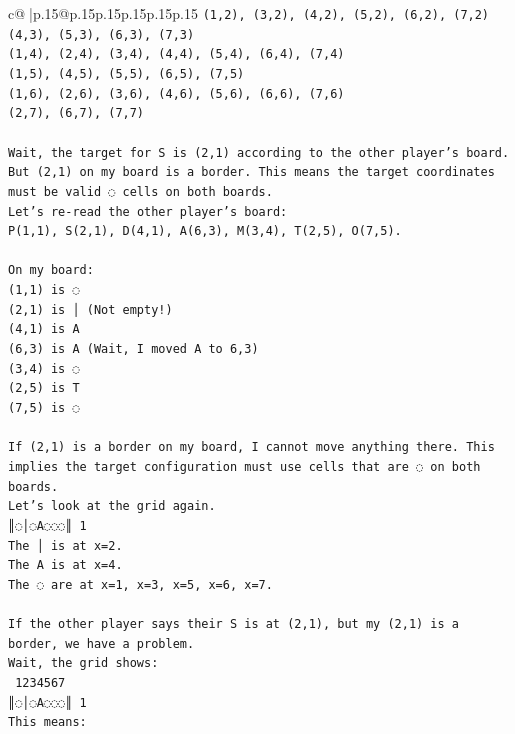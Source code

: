 \documentclass{article}
\begin{document}
{\begin{supertabular}{c@{$\;$}|p{.15\linewidth}@{}p{.15\linewidth}p{.15\linewidth}p{.15\linewidth}p{.15\linewidth}p{.15\linewidth}}
{{{\texttt{(1,2), (3,2), (4,2), (5,2), (6,2), (7,2)} \\
\texttt{(4,3), (5,3), (6,3), (7,3)} \\
\texttt{(1,4), (2,4), (3,4), (4,4), (5,4), (6,4), (7,4)} \\
\texttt{(1,5), (4,5), (5,5), (6,5), (7,5)} \\
\texttt{(1,6), (2,6), (3,6), (4,6), (5,6), (6,6), (7,6)} \\
\texttt{(2,7), (6,7), (7,7)} \\
\\ 
\texttt{Wait, the target for S is (2,1) according to the other player's board. But (2,1) on my board is a border. This means the target coordinates must be valid ◌ cells on both boards.} \\
\texttt{Let's re{-}read the other player's board:} \\
\texttt{P(1,1), S(2,1), D(4,1), A(6,3), M(3,4), T(2,5), O(7,5).} \\
\\ 
\texttt{On my board:} \\
\texttt{(1,1) is ◌} \\
\texttt{(2,1) is │ (Not empty!)} \\
\texttt{(4,1) is A} \\
\texttt{(6,3) is A (Wait, I moved A to 6,3)} \\
\texttt{(3,4) is ◌} \\
\texttt{(2,5) is T} \\
\texttt{(7,5) is ◌} \\
\\ 
\texttt{If (2,1) is a border on my board, I cannot move anything there. This implies the target configuration must use cells that are ◌ on both boards.} \\
\texttt{Let's look at the grid again.} \\
\texttt{║◌│◌A◌◌◌║ 1} \\
\texttt{The │ is at x=2.} \\
\texttt{The A is at x=4.} \\
\texttt{The ◌ are at x=1, x=3, x=5, x=6, x=7.} \\
\\ 
\texttt{If the other player says their S is at (2,1), but my (2,1) is a border, we have a problem.} \\
\texttt{Wait, the grid shows:} \\
\texttt{ 1234567} \\
\texttt{║◌│◌A◌◌◌║ 1} \\
\texttt{This means:} \\
}}}
\end{supertabular}}
\end{document}
